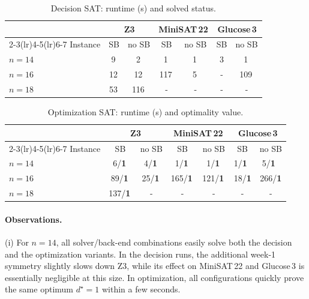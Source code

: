 \documentclass{article}
\begin{document}
\begin{table}[h]
\centering
\small
\begin{tabular}{lcccccc}
\toprule
& \multicolumn{2}{c}{Z3} & \multicolumn{2}{c}{MiniSAT\,22} & \multicolumn{2}{c}{Glucose\,3} \\
\cmidrule(lr){2-3}\cmidrule(lr){4-5}\cmidrule(lr){6-7}
Instance & SB & no SB & SB & no SB & SB & no SB \\
\midrule
$n=14$ & 9\, & 2\, & 1\, & 1\, & 3 & 1\, \\
$n=16$ & 12\, & 12\, & 117\, & 5\, & - & 109\, \\
$n=18$ & 53\, & 116\, & - & - & - & - \\
\bottomrule
\end{tabular}
\caption{Decision SAT: runtime (s) and solved status.}
\label{tab:sat-decision}
\end{table}  

\begin{table}[h]
\centering
\small
\begin{tabular}{lcccccc}
\toprule
& \multicolumn{2}{c}{Z3} & \multicolumn{2}{c}{MiniSAT\,22} & \multicolumn{2}{c}{Glucose\,3} \\
\cmidrule(lr){2-3}\cmidrule(lr){4-5}\cmidrule(lr){6-7}
Instance & SB & no SB & SB & no SB & SB & no SB \\
\midrule
$n=14$ & 6/\textbf{1}\, & 4/\textbf{1}\, & 1/\textbf{1}\, & 1/\textbf{1}\, & 1/\textbf{1}\ & 5/\textbf{1}\ \\
$n=16$ & 89/\textbf{1}\, & 25/\textbf{1}\, & 165/\textbf{1}\, & 121/\textbf{1}\, & 18/\textbf{1} & 266/\textbf{1} \\
$n=18$ & 137/\textbf{1}\, & - & - & - & - & - \\
\bottomrule
\end{tabular}
\caption{Optimization SAT: runtime (s) and optimality value.}
\label{tab:sat-optim}
\end{table}

\noindent

\paragraph{Observations.}

(i) For $n=14$, all solver/back-end combinations easily solve both the decision
and the optimization variants. In the decision runs,
the additional week-1 symmetry slightly slows down Z3,
while its effect on MiniSAT\,22 and Glucose\,3 is essentially negligible at this
size. In optimization, all configurations quickly prove the same optimum $d^\star = 1$ within a few seconds.
\end{document}
